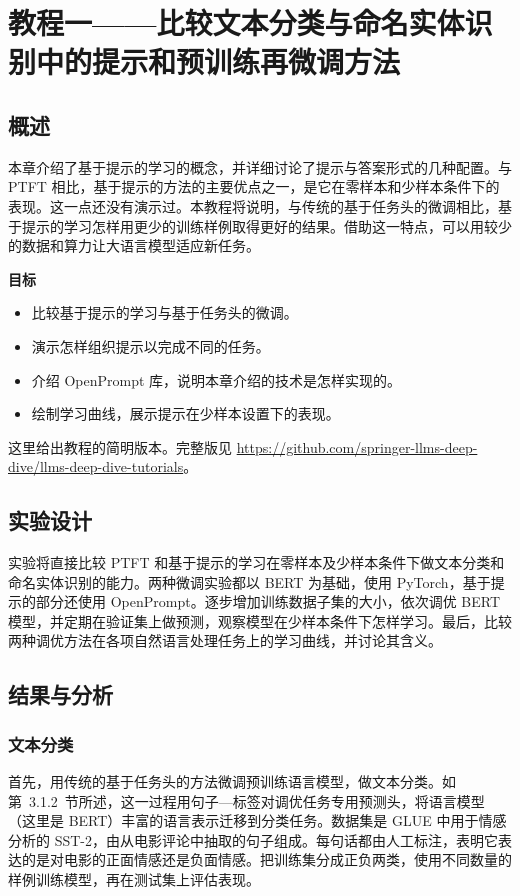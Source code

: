 \section{教程一——比较文本分类与命名实体识别中的提示和预训练再微调方法}
\label{sec:ch03-tutorial-one}
\subsection{概述}
本章介绍了基于提示的学习的概念，并详细讨论了提示与答案形式的几种配置。与 PTFT 相比，基于提示的方法的主要优点之一，是它在零样本和少样本条件下的表现。这一点还没有演示过。本教程将说明，与传统的基于任务头的微调相比，基于提示的学习怎样用更少的训练样例取得更好的结果。借助这一特点，可以用较少的数据和算力让大语言模型适应新任务。

\begin{keypoint}
\noindent\textbf{目标}
\begin{itemize}
\item 比较基于提示的学习与基于任务头的微调。
\item 演示怎样组织提示以完成不同的任务。
\item 介绍 OpenPrompt 库，说明本章介绍的技术是怎样实现的。
\item 绘制学习曲线，展示提示在少样本设置下的表现。
\end{itemize}
\end{keypoint}

这里给出教程的简明版本。完整版见 \url{https://github.com/springer-llms-deep-dive/llms-deep-dive-tutorials}。

\subsection{实验设计}
实验将直接比较 PTFT 和基于提示的学习在零样本及少样本条件下做文本分类和命名实体识别的能力。两种微调实验都以 BERT 为基础，使用 PyTorch，基于提示的部分还使用 OpenPrompt。逐步增加训练数据子集的大小，依次调优 BERT 模型，并定期在验证集上做预测，观察模型在少样本条件下怎样学习。最后，比较两种调优方法在各项自然语言处理任务上的学习曲线，并讨论其含义。

\subsection{结果与分析}
\subsubsection{文本分类}
首先，用传统的基于任务头的方法微调预训练语言模型，做文本分类。如第~3.1.2~节所述，这一过程用句子—标签对调优任务专用预测头，将语言模型（这里是 BERT）丰富的语言表示迁移到分类任务。数据集是 GLUE 中用于情感分析的 SST-2，由从电影评论中抽取的句子组成。每句话都由人工标注，表明它表达的是对电影的正面情感还是负面情感。把训练集分成正负两类，使用不同数量的样例训练模型，再在测试集上评估表现。

